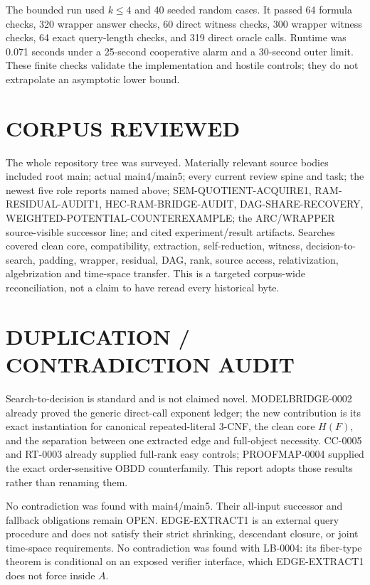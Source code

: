 \documentclass[11pt]{article}
\begin{document}
The bounded run used $k\le4$ and 40 seeded random cases.  It passed 64
formula checks, 320 wrapper answer checks, 60 direct witness checks, 300
wrapper witness checks, 64 exact query-length checks, and 319 direct oracle
calls.  Runtime was 0.071 seconds under a 25-second cooperative alarm and a
30-second outer limit.  These finite checks validate the implementation and
hostile controls; they do not extrapolate an asymptotic lower bound.

\section{CORPUS REVIEWED}
The whole repository tree was surveyed.  Materially relevant source bodies
included root main; actual main4/main5; every current review spine and task;
the newest five role reports named above; SEM-QUOTIENT-ACQUIRE1,
RAM-RESIDUAL-AUDIT1, HEC-RAM-BRIDGE-AUDIT, DAG-SHARE-RECOVERY,
WEIGHTED-POTENTIAL-COUNTEREXAMPLE; the ARC/WRAPPER source-visible successor
line; and cited experiment/result artifacts.  Searches covered clean core,
compatibility, extraction, self-reduction, witness, decision-to-search,
padding, wrapper, residual, DAG, rank, source access, relativization,
algebrization and time-space transfer.  This is a targeted corpus-wide
reconciliation, not a claim to have reread every historical byte.

\section{DUPLICATION / CONTRADICTION AUDIT}
Search-to-decision is standard and is not claimed novel.  MODELBRIDGE-0002
already proved the generic direct-call exponent ledger; the new contribution
is its exact instantiation for canonical repeated-literal 3-CNF, the clean
core $H(F)$, and the separation between one extracted edge and full-object
necessity.  CC-0005 and RT-0003 already supplied full-rank easy controls;
PROOFMAP-0004 supplied the exact order-sensitive OBDD counterfamily.  This
report adopts those results rather than renaming them.

No contradiction was found with main4/main5.  Their all-input successor and
fallback obligations remain OPEN.  EDGE-EXTRACT1 is an external query
procedure and does not satisfy their strict shrinking, descendant closure,
or joint time-space requirements.  No contradiction was found with LB-0004:
its fiber-type theorem is conditional on an exposed verifier interface,
which EDGE-EXTRACT1 does not force inside $A$.
\end{document}
